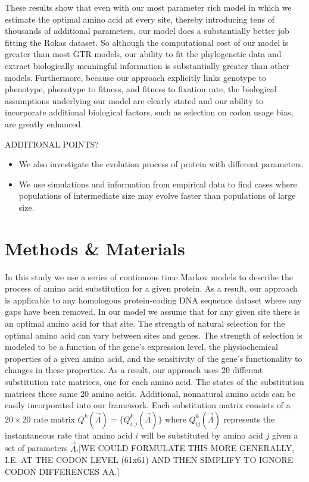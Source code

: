 \documentclass[13pt]{article}
\begin{document}
These results show that even with our most parameter rich model in which we estimate the optimal amino acid at every site, thereby introducing tens of thousands of additional parameters, our model does a substantially better job fitting the Rokas dataset.
So although the computational cost of our model is greater than most GTR models,  our ability to fit the phylogenetic data and extract biologically meaningful information is substantially greater than other models.
Furthermore, because our approach explicitly links genotype to phenotype, phenotype to fitness, and fitness to fixation rate, the biological assumptions underlying our model are clearly stated and our ability to incorporate additional biological factors, such as selection on codon usage bias, are greatly enhanced.
 
ADDITIONAL POINTS?
\begin{itemize}
\item We also investigate the evolution process of protein with different parameters.
\item We use simulations and information from empirical data to find cases where populations of intermediate size may evolve faster than populations of large size.
\end{itemize}


\section{Methods \& Materials}
In this study we use a series of continuous time Markov models to describe the process of amino acid substitution for a given protein.
As a result, our approach is applicable to any homologous protein-coding DNA sequence dataset where any gaps have been removed.
In our model we assume that for any given site there is an optimal amino acid for that site.
The strength of natural selection for the optimal amino acid can vary between sites and genes.
The strength of selection is modeled to be a function of the gene's expression level, the physiochemical properties of a given amino acid, and the sensitivity of the gene's functionality to changes in these properties.
As a result, our approach uses 20 different substitution rate matrices, one for each amino acid. 
The states of the substitution matrices these same 20 amino acids.
Additional, nonnatural amino acids can be easily incorporated into our framework.
Each substitution matrix consists of a  $20 \times 20$ rate matrix $Q^k(\vec{\Lambda})=\{Q^k_{i,j}(\vec{\Lambda})\}$ where $Q^k_{ij}(\vec{\Lambda})$ represents the instantaneous rate that amino acid $i$ will be substituted by amino acid $j$ given a set of parameters $\vec{\Lambda}$.[WE COULD FORMULATE THIS MORE GENERALLY, I.E. AT THE CODON LEVEL (61x61) AND THEN SIMPLIFY TO IGNORE CODON DIFFERENCES AA.]
\end{document}
